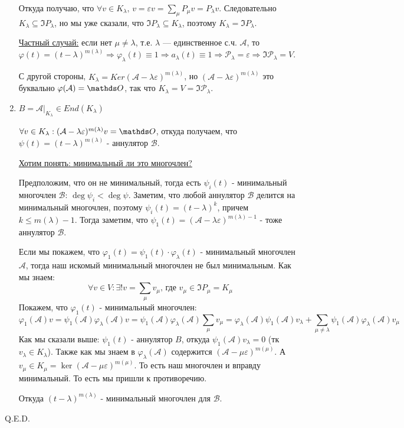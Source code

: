 \begin{enumerate}
    Откуда получаю, что $\forall v \in K_{\lambda}, \, v= \varepsilon v = \sum\limits_{\mu}P_{\mu}v=P_{\lambda}v$. Следовательно $ K_{\lambda }\subseteq \Im P_{\lambda}$, но мы уже сказали, что  $ \Im P_{\lambda} \subseteq K_{\lambda}$, поэтому $ K_{\lambda }= \Im P_{\lambda}$.

    \uline{Частный случай:} если нет $\mu \ne \lambda$, т.е. $\lambda$ --- единственное с.ч. $\mathcal{A}$, то $\varphi(t) = (t - \lambda)^{m(\lambda)} \Rightarrow \varphi_{\lambda}(t) \equiv 1 \Rightarrow a_{\lambda}(t) \equiv 1 \Rightarrow \mathcal{P}_{\lambda} = \varepsilon \Rightarrow \Im\mathcal{P}_{\lambda} = V$.

    С другой стороны, $K_{\lambda} = Ker(\mathcal{A} - \lambda\varepsilon)^{m(\lambda)}$, но $(\mathcal{A} - \lambda\varepsilon)^{m(\lambda)}$ это буквально $\varphi(\mathcal{A}) = \zero$, так что $K_{\lambda} = V = \Im\mathcal{P}_{\lambda}$.
    

    \item $B = \mathcal{A}\Big|_{K_{\lambda}}\in End(K_{\lambda})$
    
    $\forall v \in K_{\lambda}:(\mathcal{A}-\lambda \varepsilon)^{m(\lambda)}v = \zero$, откуда получаем, что $\psi(t) = (t-\lambda)^{m(\lambda)}$ - аннулятор $\mathcal{B}$. 

    \uline{Хотим понять: минимальный ли это многочлен?} 
    
    Предположим, что он не минимальный, тогда есть $\psi_i(t)$ - минимальный многочлен $\mathcal{B}$: $\deg \psi_i <\deg \psi$. Заметим, что любой аннулятор $\mathcal{B}$ делится на минимальный многочлен, поэтому $\psi_i(t) =(t-\lambda )^{k}$, причем $k \leq m(\lambda)-1$. Тогда заметим, что $\psi_1(t) = (\mathcal{A}-\lambda \varepsilon)^{m(\lambda)-1}$ - тоже аннулятор $\mathcal{B}$. 

    Если мы покажем, что $\varphi_1(t)=\psi_1(t)\cdot \varphi_{\lambda}(t)$ - минимальный многочлен $\mathcal{A}$, тогда наш искомый минимальный многочлен не был минимальным. Как мы знаем:
    $$\forall v \in V: \exists! v =\sum\limits_{\mu} v_{\mu}\text{, где }v_{\mu}\in \Im P_\mu =  K_\mu$$
    Покажем, что $\varphi_1(t)$ - минимальный многочлен:
$$\varphi_1(\mathcal{A})v=\psi_1(\mathcal{A}) \varphi_{\lambda}(\mathcal{A})v = \psi_1(\mathcal{A}) \varphi_{\lambda}(\mathcal{A})\sum\limits_{\mu} v_{\mu} = \varphi_{\lambda}(\mathcal{A})\psi_1(\mathcal{A})v_\lambda + \sum\limits_{\mu\neq \lambda}\psi_1(\mathcal{A}) \varphi_{\lambda}(\mathcal{A}) v_{\mu}$$
Как мы сказали выше: $\psi_1(t)$ - аннулятор $B$, откуда $\psi_1(\mathcal{A})v_{\lambda} = 0$ (тк $v_\lambda \in K_\lambda$). Также как мы знаем в $\varphi_\lambda(\mathcal{A})$ содержится $(\mathcal{A}-\mu\varepsilon)^{m(\mu)}$. А $v_{\mu} \in K_{\mu} = \ker (\mathcal{A}-\mu\varepsilon)^{m(\mu)}$. То есть наш многочлен и вправду минимальный. То есть мы пришли к противоречию. 

Откуда $(t-\lambda)^{m(\lambda)}$ - минимальный многочлен для $\mathcal{B}$.
    
\end{enumerate}
 \hfill Q.E.D.


